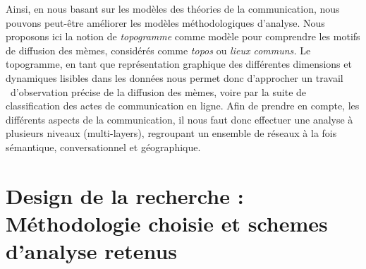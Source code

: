 Ainsi, en nous basant sur les mod\`eles des th\'eories de la
communication, nous pouvons peut-\^etre am\'eliorer les mod\`eles
m\'ethodologiques d{\textquoteright}analyse. Nous proposons ici la
notion de \textit{topogramme }comme mod\`ele pour comprendre les motifs
de diffusion des m\`emes, consid\'er\'es comme \textit{topos} ou
\textit{lieux communs. }Le topogramme, en tant que repr\'esentation
graphique des diff\'erentes dimensions et dynamiques lisibles dans les
donn\'ees nous permet donc d{\textquoteright}approcher un travail
\ d{\textquoteright}observation pr\'ecise de la diffusion des m\`emes,
voire par la suite de classification des actes de communication en
ligne. Afin de prendre en compte, les diff\'erents aspects de la
communication, il nous faut donc effectuer une analyse \`a plusieurs
niveaux (multi-layers), regroupant un ensemble de r\'eseaux \`a la fois
s\'emantique, conversationnel et g\'eographique. 



\section{Design de la recherche : M\'ethodologie choisie et schemes d{\textquoteright}analyse retenus}

